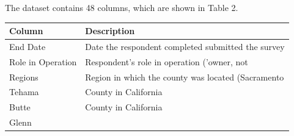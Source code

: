 \documentclass[12pt,]{article}
\begin{document}
The dataset contains 48 columns, which are shown in Table 2.

\begin{longtable}[]{@{}ll@{}}
\toprule
\begin{minipage}[b]{0.59\columnwidth}\raggedright\strut
Column\strut
\end{minipage} & \begin{minipage}[b]{0.18\columnwidth}\raggedright\strut
Description\strut
\end{minipage}\tabularnewline
\midrule
\endhead
\begin{minipage}[t]{0.59\columnwidth}\raggedright\strut
End Date\strut
\end{minipage} & \begin{minipage}[t]{0.18\columnwidth}\raggedright\strut
Date the respondent completed submitted the survey\strut
\end{minipage}\tabularnewline
\begin{minipage}[t]{0.59\columnwidth}\raggedright\strut
Role in Operation\strut
\end{minipage} & \begin{minipage}[t]{0.18\columnwidth}\raggedright\strut
Respondent's role in operation ('owner, not\strut
\end{minipage}\tabularnewline
\begin{minipage}[t]{0.59\columnwidth}\raggedright\strut
Regions\strut
\end{minipage} & \begin{minipage}[t]{0.18\columnwidth}\raggedright\strut
Region in which the county was located (Sacramento\strut
\end{minipage}\tabularnewline
\begin{minipage}[t]{0.59\columnwidth}\raggedright\strut
Tehama\strut
\end{minipage} & \begin{minipage}[t]{0.18\columnwidth}\raggedright\strut
County in California\strut
\end{minipage}\tabularnewline
\begin{minipage}[t]{0.59\columnwidth}\raggedright\strut
Butte\strut
\end{minipage} & \begin{minipage}[t]{0.18\columnwidth}\raggedright\strut
County in California\strut
\end{minipage}\tabularnewline
\begin{minipage}[t]{0.59\columnwidth}\raggedright\strut
Glenn\strut
\end{minipage} & \begin{minipage}[t]{0.18\columnwidth}\raggedright\strut

\end{minipage}
\end{longtable}
\end{document}
